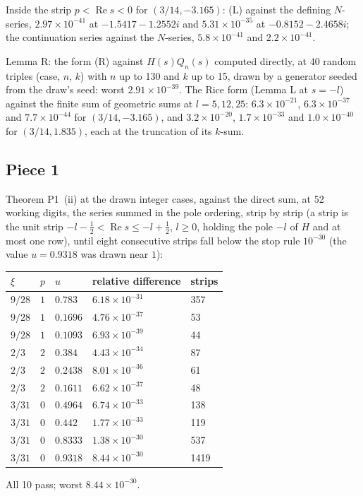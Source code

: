 \documentclass[11pt]{article}
\newcommand{\re}{\operatorname{Re}}
\begin{document}
Inside the strip $p<\re s<0$ for $(3/14,-3.165)$: (L) against the defining $N$-series, $2.97\times10^{-41}$ at $-1.5417-1.2552i$ and $5.31\times10^{-35}$ at $-0.8152-2.4658i$; the continuation series against the $N$-series, $5.8\times10^{-41}$ and $2.2\times10^{-41}$.

Lemma R: the form (R) against $H(s)Q_n(s)$ computed directly, at 40 random triples (case, $n$, $k$) with $n$ up to 130 and $k$ up to 15, drawn by a generator seeded from the draw's seed: worst $2.91\times10^{-39}$. The Rice form (Lemma L at $s=-l$) against the finite sum of geometric sums at $l=5,12,25$: $6.3\times10^{-21}$, $6.3\times10^{-37}$ and $7.7\times10^{-44}$ for $(3/14,-3.165)$, and $3.2\times10^{-20}$, $1.7\times10^{-33}$ and $1.0\times10^{-40}$ for $(3/14,1.835)$, each at the truncation of its $k$-sum.

\subsection{Piece 1}

Theorem P1~(ii) at the drawn integer cases, against the direct sum, at 52 working digits, the series summed in the pole ordering, strip by strip (a strip is the unit strip $-l-\frac12<\re s\le-l+\frac12$, $l\ge0$, holding the pole $-l$ of $H$ and at most one row), until eight consecutive strips fall below the stop rule $10^{-30}$ (the value $u=0.9318$ was drawn near $1$):
\begin{center}
\begin{tabular}{lllll}
$\xi$ & $p$ & $u$ & relative difference & strips\\
\hline
$9/28$ & $1$ & $0.783$ & $6.18\times10^{-31}$ & 357\\
$9/28$ & $1$ & $0.1696$ & $4.76\times10^{-37}$ & 53\\
$9/28$ & $1$ & $0.1093$ & $6.93\times10^{-39}$ & 44\\
$2/3$ & $2$ & $0.384$ & $4.43\times10^{-34}$ & 87\\
$2/3$ & $2$ & $0.2438$ & $8.01\times10^{-36}$ & 61\\
$2/3$ & $2$ & $0.1611$ & $6.62\times10^{-37}$ & 48\\
$3/31$ & $0$ & $0.4964$ & $6.74\times10^{-33}$ & 138\\
$3/31$ & $0$ & $0.442$ & $1.77\times10^{-33}$ & 119\\
$3/31$ & $0$ & $0.8333$ & $1.38\times10^{-30}$ & 537\\
$3/31$ & $0$ & $0.9318$ & $8.44\times10^{-30}$ & 1419\\
\end{tabular}
\end{center}
All 10 pass; worst $8.44\times10^{-30}$.
\end{document}
